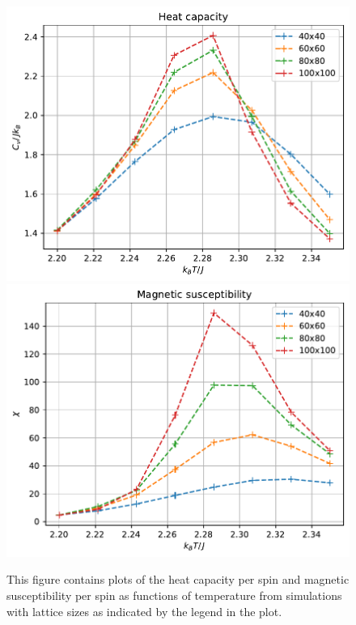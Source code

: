 \documentclass[reprint,english,notitlepage]{revtex4-1}  %
\begin{document}
\begin{figure}[H]
\centering
\includegraphics[width=\columnwidth]{../data/phase-transition-Cv.pdf}
\includegraphics[width=\columnwidth]{../data/phase-transition-Xi.pdf}
\caption{This figure contains plots of the heat capacity per spin and magnetic susceptibility per spin as functions of temperature from simulations with lattice sizes as indicated by the legend in the plot.} \label{fig:ph-heat-capacity-susceptibility}
\end{figure}
\end{document}
